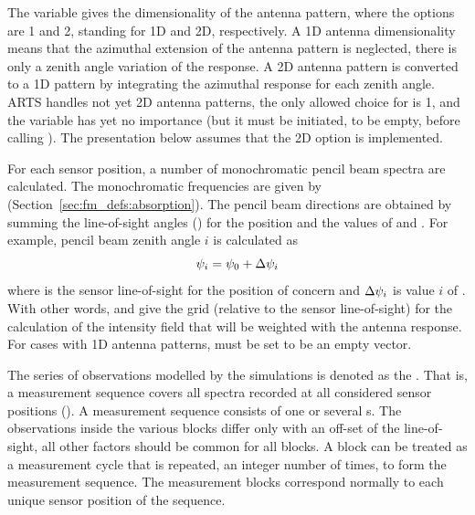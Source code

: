 The variable  gives the dimensionality of the
antenna pattern, where the
options are 1 and 2, standing for 1D and 2D, respectively. A 1D
antenna dimensionality means that the azimuthal extension of the
antenna pattern is neglected, there is only a zenith angle variation
of the response. A 2D antenna pattern is converted to a 1D pattern by
integrating the azimuthal response for each zenith angle. ARTS handles
not yet 2D antenna patterns, the only allowed choice for
 is 1, and the variable
 has yet no importance (but it must be
initiated, to be empty, before calling ). The
presentation below assumes that the 2D option is implemented.

For each sensor position, a number of monochromatic pencil beam
spectra are calculated. The monochromatic frequencies are given by
 (Section~\ref{sec:fm_defs:absorption}). The pencil
beam directions are obtained by summing the line-of-sight angles
() for the position and the values of
 and . For
example, pencil beam zenith angle $i$ is calculated as
\begin{equation}
  \psi_{i} = \psi_{0} + \Delta\psi_{i}
  \label{eq:fm_defs:psi_grid}
\end{equation}
where  is the sensor line-of-sight for the position of
concern and $\Delta\psi_{i}$ is value $i$ of
.  With other words,
 and  give
the grid (relative to the sensor line-of-sight) for the calculation of
the intensity field that will be weighted with the antenna response.
For cases with 1D antenna patterns, 
must be set to be an empty vector.


\label{sec:fm_defs:seqsandblocks}

The series of observations modelled by the simulations is denoted as
the . That is, a measurement sequence
covers all spectra recorded at all considered sensor positions
(). A measurement sequence consists of one or several
s. The observations inside the various
blocks differ only with an off-set of the line-of-sight, all other
factors should be common for all blocks. A block can be treated as a
measurement cycle that is repeated, an integer number of times, to
form the measurement sequence.  The measurement blocks correspond
normally to each unique sensor position of the sequence.

